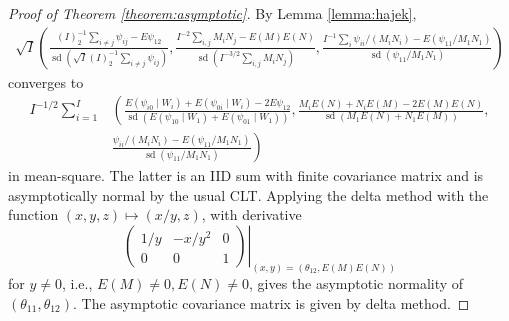 \documentclass[12pt]{article}
\DeclareMathOperator{\AUC}{AUC}
\DeclareMathOperator{\sd}{sd}
\newcommand{\I}{I}
\newcommand{\E}{E}
\newcommand{\cind}{\perp \!\!\! \perp}
\newcommand{\aucindiv}{\theta_{11}}%
\newcommand{\aucpop}{\theta_{12}}%
\newcommand{\Kernel}{\psi}
\newcommand{\W}[1]{W_{#1}}
\newcommand{\comment}[1]{
  \iftoggle{commenttoggle}{
    {\normalsize{\color{red}{ #1}}\normalsize}
  }
  {}
}
\begin{document}
  \begin{proof}[Proof of Theorem \ref{theorem:asymptotic}]

    By Lemma \ref{lemma:hajek},%
  \begin{align}
    \sqrt{\I}\left(
    \frac{(\I)_2^{-1}\sum_{i\neq j}\Kernel_{ij}-\E\Kernel_{12}}{\sd(\sqrt{\I}(\I)_2^{-1}\sum_{i\neq j}\Kernel_{ij})}
    ,
    \frac{\I^{-2}\sum_{i,j}M_iN_j - \E (M)\E (N)}
    {\sd(\I^{-3/2}\sum_{i, j}M_iN_j ) }
    ,
     \frac{\I^{-1}\sum_i \Kernel_{ii}/(M_iN_i) - \E(\Kernel_{11}/M_1N_1)}
     {\sd(\Kernel_{11}/M_1N_1)}
    \right)
  \end{align}
  converges to
  \begin{align}
    \I^{-1/2}\sum_{i=1}^\I & \left(
     \frac{\E(\Kernel_{i0}\mid\W{i})+\E(\Kernel_{0i}\mid\W{i})-2\E\Kernel_{12}}
    {\sd(\E(\Kernel_{10}\mid\W{1})+\E(\Kernel_{01}\mid\W{1}))}
    ,
     \frac{M_i\E (N) + N_i\E (M) - 2\E (M)\E (N)}
     {\sd(M_1\E (N) + N_1\E (M))}
     ,\right.\\
     &\left.
     \frac{ \Kernel_{ii}/(M_iN_i) - \E(\Kernel_{11}/M_1N_1)}
    {\sd(\Kernel_{11}/M_1N_1)}
    \right)
  \end{align}
  in mean-square. The latter is an IID sum with finite covariance matrix and is asymptotically normal by the usual CLT.
  Applying the delta method with the function
  $(x,y,z)\mapsto (x/y,z)$, with derivative
  $$
\left.  \begin{pmatrix}
    1/y & -x/y^2 & 0 \\
    0 & 0 & 1
  \end{pmatrix} \right|_{(x,y)=(\aucpop,\E (M) \E (N))}
  $$
  for $y\neq 0$, i.e., $E(M)\neq 0, E(N)\neq 0$, gives the asymptotic normality of $(\aucindiv,\aucpop)$.
  The asymptotic covariance matrix is given by delta method. %








\end{proof}
\end{document}
